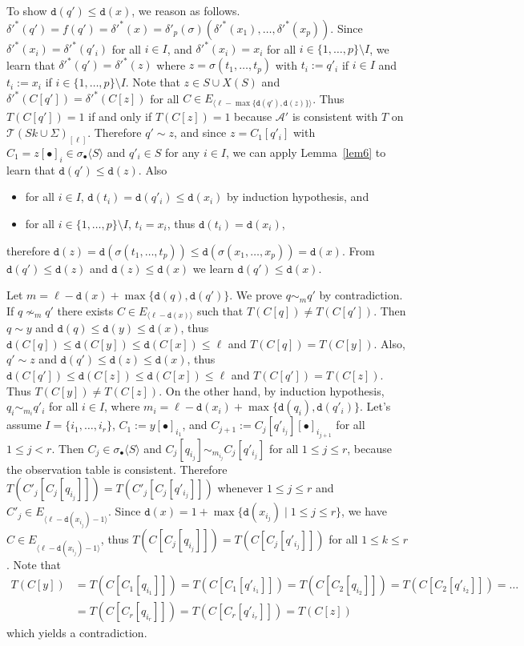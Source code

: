 \documentclass[preprint,12pt,english]{article}
\def\hole{\bullet}
\def\cA{\mathcal{A}}
\def\cT{\mathcal{T}}
\def\depth{\mathtt{d}}
\newcommand\pair[1]{\langle{#1}\rangle}
\begin{document}
To show $\depth(q')\leq\depth(x)$, we reason as follows. $\delta'^*(q')=f(q')=\delta'^*(x)=\delta'_p(\sigma)(\delta'^*(x_1),\ldots,\delta'^*(x_p))$. Since $\delta'^*(x_i)=\delta'^*(q'_i)$ for all $i\in I$, and $\delta'^*(x_i)=x_i$ for all $i\in\{1,\ldots,p\}\setminus I$, we learn that $\delta'^*(q')=\delta'^*(z)$ where $z=\sigma(t_1,\ldots,t_p)$ with $t_i:=q'_i$ if $i\in I$ and $t_i:=x_i$ if $i\in\{1,\ldots,p\}\setminus I$.  Note that $z\in S\cup X(S)$ and $\delta'^*(C[q'])=\delta'^*(C[z])$ for all $C\in E_{\pair{\ell-\max\{\depth(q'),\depth(z)\}}}$. Thus $T(C[q'])=1$ if and only if $T(C[z])=1$ because $\cA'$ is consistent with $T$ on $\cT(Sk\cup\Sigma)_{[\ell]}$. Therefore $q'\sim z$, and since $z=C_1[q'_i]$ with $C_1=z[\hole]_i\in\sigma_\hole\pair{S}$ and $q'_i\in S$ for any $i\in I$, we can apply Lemma~\ref{lem6} to learn that $\depth(q')\leq\depth(z).$
Also
\begin{itemize}
\item for all $i\in I$, $\depth(t_i)=\depth(q'_i)\leq \depth(x_i)$ by induction hypothesis, and
\item for all $i\in \{1,\ldots,p\}\setminus I$, $t_i=x_i$, thus $\depth(t_i)=\depth(x_i)$,
\end{itemize}
therefore $\depth(z)=\depth(\sigma(t_1,\ldots,t_p))\leq\depth(\sigma(x_1,\ldots,x_p))=\depth(x).$ From $\depth(q')\leq\depth(z)$ and $\depth(z)\leq\depth(x)$ we learn $\depth(q')\leq\depth(x).$

Let $m=\ell-\depth(x)+\max\{\depth(q),\depth(q')\}$.
We prove $q\sim_m q'$ by contradiction. 
If $q\nsim_m q'$  there exists $C\in E_{\pair{\ell-\depth(x)}}$ such that $T(C[q])\neq T(C[q']).$ Then $q\sim y$ and $\depth(q)\leq\depth(y)\leq\depth(x)$, thus $\depth(C[q])\leq\depth(C[y])\leq\depth(C[x])\leq\ell$ and  $T(C[q])=T(C[y])$. 
Also, $q'\sim z$ and $\depth(q')\leq\depth(z)\leq\depth(x)$, thus $\depth(C[q'])\leq\depth(C[z])\leq\depth(C[x])\leq \ell$ and $T(C[q'])=T(C[z]).$ Thus $T(C[y])\neq T(C[z]).$ On the other hand, by induction hypothesis, $q_i\sim_{m_i} q'_i$ for all $i\in I$, where $m_i=\ell-\depth(x_i)+\max\{\depth(q_i),\depth(q'_i)\}.$
Let's assume $I=\{i_1,\ldots,i_r\}$,  $C_1:=y[\hole]_{i_1}$, and $C_{j+1}:=C_{j}[q'_{i_j}][\hole]_{i_{j+1}}$ for all $1\leq j< r.$ 
Then $C_j\in\sigma_\hole\pair{S}$ and $C_j[q_{i_j}]\sim_{m_{i_j}}C_j[q'_{i_j}]$ for all $1\leq j\leq r$, because the observation table is consistent. Therefore $T(C'_j[C_j[q_{i_j}]])=T(C'_j[C_j[q'_{i_j}]])$ whenever $1\leq j\leq r$ and  $C'_j\in E_{\pair{\ell-\depth(x_{i_j})-1}}$. Since $\depth(x)=1+\max\{\depth(x_{i_j})\mid 1\leq j\leq r\}$, we have
$C\in  E_{\pair{\ell-\depth(x_{i_j})-1}}$, thus $T(C[C_j[q_{i_j}]])=T(C[C_j[q'_{i_j}]])$ for all $1\leq k\leq r$.
 Note that
\begin{align*}
T(C[y])&=T(C[C_1[q_{i_1}]])=T(C[C_1[q'_{i_1}]])=T(C[C_2[q_{i_2}]])=T(C[C_2[q'_{i_2}]])=\ldots\\
&=T(C[C_r[q_{i_r}]])=T(C[C_r[q'_{i_r}]])=T(C[z])
\end{align*}
which yields a contradiction. 
\end{document}
